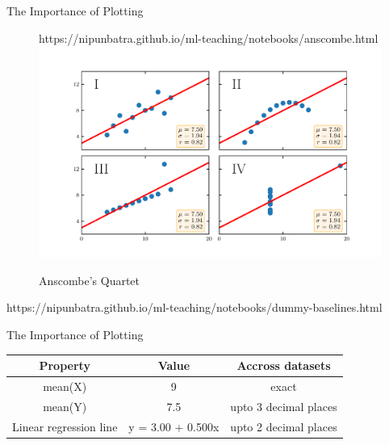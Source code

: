 \documentclass[usenames,dvipsnames]{beamer}
\begin{document}
\begin{frame}{The Importance of Plotting}
    \begin{figure}[htp]
      \centering
      \begin{notebookbox}{https://nipunbatra.github.io/ml-teaching/notebooks/anscombe.html}
        \includegraphics[width=\linewidth]{../figures/anscombe.pdf}
      \end{notebookbox}
      \caption{Anscombe’s Quartet}
    \end{figure}
  \end{frame}

  \begin{frame}
	\begin{notebookbox}{https://nipunbatra.github.io/ml-teaching/notebooks/dummy-baselines.html}
	  \end{notebookbox}
\end{frame}

\begin{frame}{The Importance of Plotting}
\begin{tabular}{|c|c|c|}
\hline 
Property & Value & Accross datasets \\ 
\hline 
mean(X) & 9 & exact \\ 
mean(Y) & 7.5 & upto 3 decimal places \\ 
Linear regression line & 	y = 3.00 + 0.500x & upto 2 decimal places \\ 
\hline 
\end{tabular} 


\end{frame}
\end{document}
